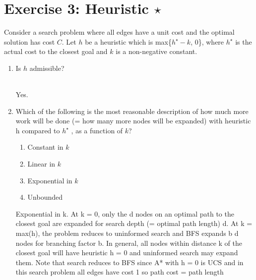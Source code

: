 \documentclass[9pt,a4paper]{extarticle}
\newenvironment{solution}
    {%
    \color{red}
    }
    { 
    \color{black}
    }
\begin{document}
\section*{Exercise 3: Heuristic $\star$}
Consider a search problem where all edges have a unit cost and the optimal solution has cost $C$. Let $h$ be a heuristic which is max\{$h^\star - k$, 0\}, where $h^\star$ is the actual cost to the closest goal and $k$ is a non-negative constant.
\begin{enumerate}
    \item Is $h$ admissible?
    \begin{solution}
    \\
    Yes.
    \end{solution}
    \item Which of the following is the most reasonable description of how much more work will be done (= how many more nodes will be expanded) with heuristic h compared to $h^\star$ , as a function of $k$?
    \begin{enumerate}
        \item Constant in $k$
        \item Linear in $k$
        \item Exponential in $k$
        \item Unbounded
    \end{enumerate}
    \begin{solution}
    Exponential in k. At k = 0, only the d nodes on an optimal path to the closest goal are expanded for search depth (= optimal path length) d. At k = max(h), the problem reduces to uninformed search and BFS expands b d nodes for branching factor b. In general, all nodes within distance k of the closest goal will have heuristic h = 0 and uninformed search may expand them. Note that search reduces to BFS since A* with h = 0 is UCS and in this search problem all edges have cost 1 so path cost = path length
    \end{solution}
\end{enumerate}
\end{document}
